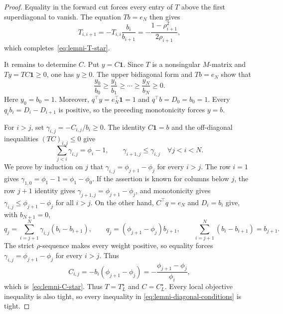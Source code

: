\documentclass[10pt,a4paper]{amsart}
\begin{document}
\begin{proof}
Equality in the forward cut forces every entry of $T$ above the first
superdiagonal to vanish. The equation $Tb=e_N$ then gives
\[
    T_{i,i+1}
    =-T_{i,i}\frac{b_i}{b_{i+1}}
    =-\frac{1-\rho_{i+1}^2}{2\rho_{i+1}},
\]
which completes~\eqref{eq:lemni-T-star}.

It remains to determine $C$. Put $y=C\mathbf1$. Since $T$ is a
nonsingular $M$-matrix and $Ty=TC\mathbf1\geq0$, one has
$y\geq0$. The upper bidiagonal form and $Tb=e_N$ show that
\[
    \frac{y_0}{b_0}\geq\frac{y_1}{b_1}\geq\cdots\geq\frac{y_N}{b_N}\geq0.
\]
Here $y_0=b_0=1$. Moreover, $q^\top y=e_N^\top\mathbf1=1$ and $q^\top b=D_0=b_0=1$.
Every $q_i b_i=D_i-D_{i+1}$ is positive, so the preceding monotonicity forces
$y=b$.

For $i>j$, set $\gamma_{i,j}=-C_{i,j}/b_i\geq0$. The identity
$C\mathbf1=b$ and the off-diagonal inequalities $(TC)_{i,j}\leq0$ give
\[
    \sum_{j<i}\gamma_{i,j}=\phi_i-1,
    \qquad
    \gamma_{i+1,j}\leq\gamma_{i,j}
    \quad \forall j<i<N.
\]
We prove by induction on $j$ that
$\gamma_{i,j}=\phi_{j+1}-\phi_j$ for every $i>j$. The row $i=1$ gives
$\gamma_{1,0}=\phi_1-1=\phi_1-\phi_0$. If the assertion is known for columns
below $j$, the row $j+1$ identity gives
$\gamma_{j+1,j}=\phi_{j+1}-\phi_j$, and monotonicity gives
$\gamma_{i,j}\leq\phi_{j+1}-\phi_j$ for all $i>j$. On the other hand,
$C^\top q=e_N$ and $D_i=b_i$ give, with $b_{N+1}=0$,
\[
    q_j=\sum_{i=j+1}^N\gamma_{i,j}(b_i-b_{i+1}),
    \qquad
    q_j=(\phi_{j+1}-\phi_j)b_{j+1},
    \qquad
    \sum_{i=j+1}^N(b_i-b_{i+1})=b_{j+1}.
\]
The strict $\rho$-sequence makes every weight positive, so equality forces
$\gamma_{i,j}=\phi_{j+1}-\phi_j$ for every $i>j$. Thus
\[
    C_{i,j}=-b_i(\phi_{j+1}-\phi_j)
    =-\frac{\phi_{j+1}-\phi_j}{\phi_i},
\]
which is~\eqref{eq:lemni-C-star}. Thus
$T=T_L^\star$ and $C=C_L^\star$. Every local objective
inequality is also tight, so every inequality in
\eqref{eq:lemni-diagonal-conditions} is tight.
\end{proof}
\end{document}

